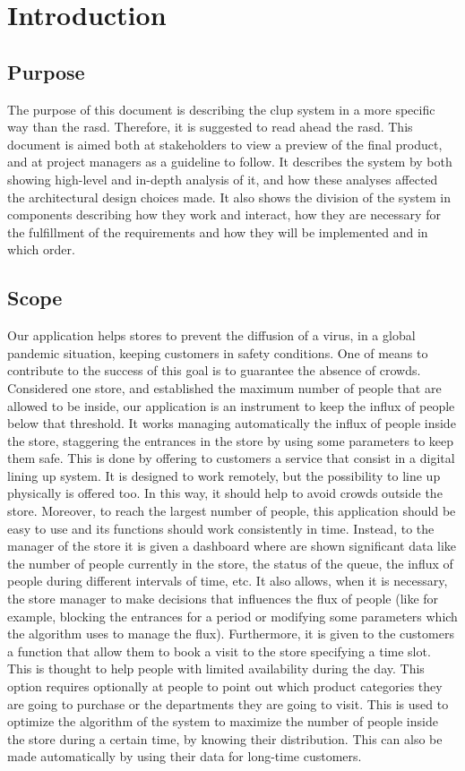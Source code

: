 \chapter{Introduction}

\section{Purpose}
The purpose of this document is describing the \gls{clup} system in a more specific way than the \gls{rasd}.
Therefore, it is suggested to read ahead the \gls{rasd}. This document is aimed both at stakeholders to view a preview of the final product, and at project managers as a guideline to follow.
It describes the system by both showing high-level and in-depth analysis of it, and how these analyses affected the architectural design choices made. It also shows the division of the system in components describing how they work and interact, how they are necessary for the fulfillment of the requirements and how they will be implemented and in which order. 

\section{Scope}
Our application helps stores to prevent the diffusion of a virus, in a global pandemic situation, keeping customers in safety conditions.
One of means to contribute to the success of this goal is to guarantee the absence of crowds.
Considered one store, and established the maximum number of people that are allowed to be inside, our application is an instrument to keep the influx of people below that threshold.
It works managing automatically the influx of people inside the store, staggering the entrances in the store by using some parameters to keep them safe.
This is done by offering to customers a service that consist in a digital lining up system. It is designed to work remotely, but the possibility to line up physically is offered too. In this way, it should help to avoid crowds outside the store.
Moreover, to reach the largest number of people, this application should be easy to use and its functions should work consistently in time. 
Instead, to the manager of the store it is given a dashboard where are shown significant data like the number of people currently in the store, the status of the queue, the influx of people during different intervals of time, etc. It also allows, when it is necessary, the store manager to make decisions that influences the flux of people (like for example, blocking the entrances for a period or modifying some parameters which the algorithm uses to manage the flux). 
Furthermore, it is given to the customers a function that allow them to book a visit to the store specifying a time slot. This is thought to help people with limited availability during the day.
This option requires optionally at people to point out which product categories they are going to purchase or the departments they are going to visit. This is used to optimize the algorithm of the system to maximize the number of people inside the store during a certain time, by knowing their distribution. This can also be made automatically by using their data for long-time customers.

